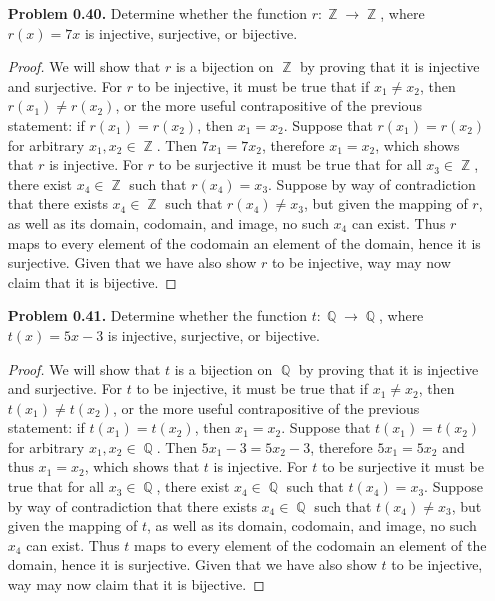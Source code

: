 \documentclass{amsart}
\DeclareMathOperator{\Z}{\mathbb{Z}}
\DeclareMathOperator{\Q}{\mathbb{Q}}
\begin{document}
\begin{enumerate}
		\item[\textbf{Problem 0.40.}] Determine whether the function $r: \Z \to \Z$, where $r(x) = 7x$ is injective, surjective, or bijective.
		\begin{proof} We will show that $r$ is a bijection on $\Z$ by proving that it is injective and surjective. 
		For $r$ to be injective, it must be true that if $x_{1} \neq x_{2}$, then $r(x_{1}) \neq r(x_{2})$, or the more useful contrapositive of the previous statement: if $r(x_{1}) = r(x_{2})$, then $x_{1} = x_{2}$. 
		Suppose that $r(x_{1}) = r(x_{2})$ for arbitrary $x_{1}, x_{2} \in \Z$. 
		Then $7x_{1} = 7x_{2}$, therefore $x_{1} = x_{2}$, which shows that $r$ is injective. 
		For $r$ to be surjective it must be true that for all $x_{3} \in \Z$, there exist $x_{4} \in \Z$ such that $r(x_{4}) = x_{3}$. 
		Suppose by way of contradiction that there exists $x_{4} \in \Z$ such that $r(x_{4}) \neq x_{3}$, but given the mapping of $r$, as well as its domain, codomain, and image, no such $x_{4}$ can exist. 
		Thus $r$ maps to every element of the codomain an element of the domain, hence it is surjective. 
		Given that we have also show $r$ to be injective, way may now claim that it is bijective.
		\end{proof}

		\item[\textbf{Problem 0.41.}] Determine whether the function $t: \Q \to \Q$, where $t(x) = 5x - 3$ is injective, surjective, or bijective.
		\begin{proof} We will show that $t$ is a bijection on $\Q$ by proving that it is injective and surjective. 
		For $t$ to be injective, it must be true that if $x_{1} \neq x_{2}$, then $t(x_{1}) \neq t(x_{2})$, or the more useful contrapositive of the previous statement: if $t(x_{1}) = t(x_{2})$, then $x_{1} = x_{2}$. 
		Suppose that $t(x_{1}) = t(x_{2})$ for arbitrary $x_{1}, x_{2} \in \Q$. 
		Then $5x_{1} - 3 = 5x_{2} - 3$, therefore $5x_{1} = 5x_{2}$ and thus $x_{1} = x_{2}$, which shows that $t$ is injective. 
		For $t$ to be surjective it must be true that for all $x_{3} \in \Q$, there exist $x_{4} \in \Q$ such that $t(x_{4}) = x_{3}$. 
		Suppose by way of contradiction that there exists $x_{4} \in \Q$ such that $t(x_{4}) \neq x_{3}$, but given the mapping of $t$, as well as its domain, codomain, and image, no such $x_{4}$ can exist. 
		Thus $t$ maps to every element of the codomain an element of the domain, hence it is surjective. 
		Given that we have also show $t$ to be injective, way may now claim that it is bijective.
		\end{proof}


\end{enumerate}
\end{document}
